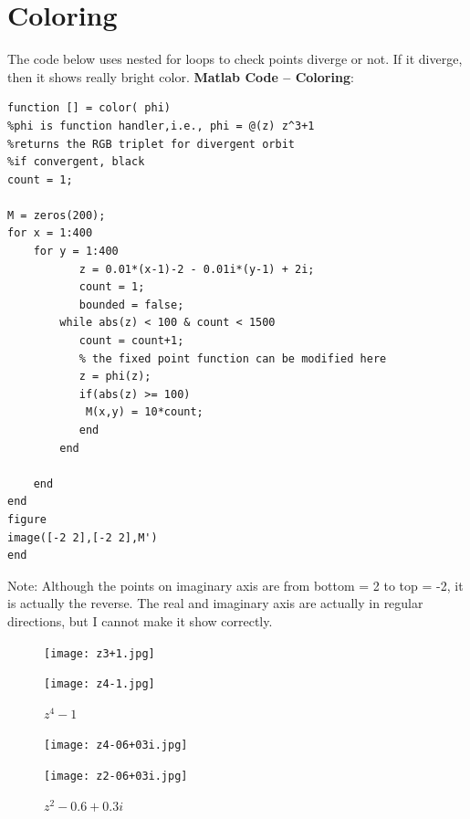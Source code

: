 \documentclass{article}
\begin{document}
\section{Coloring}
The code below uses nested for loops to check points diverge or not. If it diverge, then it shows really bright color.
\textbf{Matlab Code -- Coloring}:
\begin{lstlisting}
function [] = color( phi)
%phi is function handler,i.e., phi = @(z) z^3+1
%returns the RGB triplet for divergent orbit
%if convergent, black
count = 1;

M = zeros(200);
for x = 1:400
    for y = 1:400
           z = 0.01*(x-1)-2 - 0.01i*(y-1) + 2i;
           count = 1;
           bounded = false;
        while abs(z) < 100 & count < 1500
           count = count+1;
           % the fixed point function can be modified here
           z = phi(z);
           if(abs(z) >= 100)
            M(x,y) = 10*count;
           end
        end

    end
end
figure
image([-2 2],[-2 2],M')
end
\end{lstlisting}
Note: Although the points on imaginary axis are from bottom = 2 to top = -2, it is actually the reverse. The real and imaginary axis are actually in regular directions, but I cannot make it show correctly.
\begin{figure}[H]
  \centering
  \begin{minipage}[b]{0.49\textwidth}
    \texttt{[image: z3+1.jpg]}
    \caption{$z^3+1$}
  \end{minipage}
  \hfill
  \begin{minipage}[b]{0.5\textwidth}
    \texttt{[image: z4-1.jpg]}
    \caption{$z^4-1$}
  \end{minipage}
  \end{figure}
  \begin{figure}[H]
  \centering
    \begin{minipage}[b]{0.49\textwidth}
    \texttt{[image: z4-06+03i.jpg]}
    \caption{$z^4-0.6+0.3i$}
  \end{minipage}
  \hfill
  \begin{minipage}[b]{0.5\textwidth}
    \texttt{[image: z2-06+03i.jpg]}
    \caption{$z^2-0.6+0.3i$}
  \end{minipage}
   \end{figure}
\end{document}
